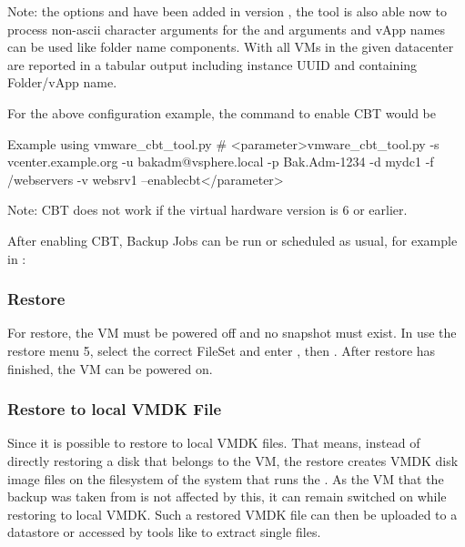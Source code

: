 Note: the options  and  have been added in
version ,
the tool is also able now to process non-ascii character arguments for the
 and  arguments and vApp names can be used
like folder name components. With  all VMs in the given datacenter
are reported in a tabular output including instance UUID and containing Folder/vApp name.

For the above configuration example, the command to enable CBT would be

\begin{commands}{Example using vmware\_cbt\_tool.py}
# <parameter>vmware_cbt_tool.py -s vcenter.example.org -u bakadm@vsphere.local -p Bak.Adm-1234 -d mydc1 -f /webservers -v websrv1 --enablecbt</parameter>
\end{commands}

Note: CBT does not work if the virtual hardware version is 6 or earlier.

After enabling CBT, Backup Jobs can be run or scheduled as usual,
for example in :


\subsubsection{Restore}

For restore, the VM must be powered off and no snapshot must exist.
In  use the restore menu 5, select the correct FileSet
and enter , then . After restore has finished,
the VM can be powered on.

\subsubsection{Restore to local VMDK File}

Since 
it is possible to restore to local VMDK files. That means, instead of directly
restoring a disk that belongs to the VM, the restore creates VMDK disk image files
on the filesystem of the system that runs the \bareosFd. As the VM that the backup
was taken from is not affected by this, it can remain switched on while restoring
to local VMDK. Such a restored VMDK file can then be uploaded to a \vSphere datastore
or accessed by tools like  to extract single files.

